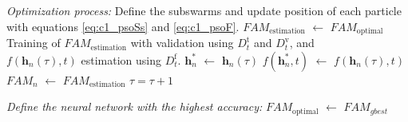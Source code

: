\begin{algorithm}[t]
{\begin{minipage}{0.97\linewidth}
\begin{algorithmic}[1]
		\Statex\vspace{6pt}\textit{Optimization process:}\vspace{6pt}
			\State Define the subswarms and update position of 
						 each particle with equations
						 \ref{eq:c1_psoSs} and \ref{eq:c1_psoF}.	\label{l:c1_newPos}
					\State $\textit{FAM}_\text{estimation}$ $\leftarrow$ 		
								 $\textit{FAM}_\text{optimal}$              \label{l:c1_curInit}
					\State Training of $\textit{FAM}_\text{estimation}$ with validation using
								 $D_t^\text{t}$ and $D_t^\text{v}$, and \\ \hspace{36pt}
								 $f(\textbf{h}_n(\tau),t)$ estimation using $D_t^\text{f}$.		      \label{l:c1_trn} 
				\EndFor
					\State $\textbf{h}^*_n$ $\leftarrow$ $\textbf{h}_n(\tau)$								  \label{l:c1_pAssign}
					\State $f(\textbf{h}^*_n,t)$ $\leftarrow$ $f(\textbf{h}_n(\tau),t)$			  \label{l:c1_pfAssign}
					\State $\textit{FAM}_n$ $\leftarrow$
								 $\textit{FAM}_\text{estimation}$					  \label{l:c1_nnpAssign}
				\EndIf 
				\State $\tau = \tau + 1$											\label{l:c1_itUpdate}
			\EndWhile \label{for_iterations}
			
			\Statex\vspace{6pt}\textit{Define the neural network with the highest
			       accuracy:}\vspace{3pt}
			\State $\textit{FAM}_\text{optimal}$ $\leftarrow$
						 $\textit{FAM}_\textit{gbest}$									\label{l:c1_assignOpt}
			\label{l:c1_optEv}
	\end{algorithmic}
	\end{minipage} }
\end{algorithm}

